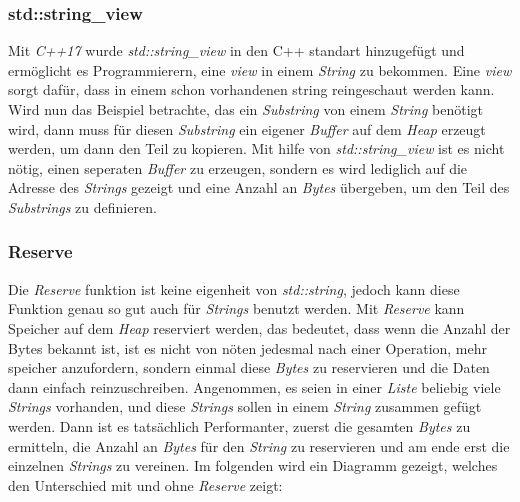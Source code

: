 \subsubsection{std::string\_view}
Mit \emph{C++17} wurde \emph{std::string\_view} in den C++ standart hinzugefügt und ermöglicht es
Programmierern, eine \emph{view} in einem \emph{String} zu bekommen. Eine \emph{view} sorgt
dafür, dass in einem schon vorhandenen string reingeschaut werden kann. Wird nun das Beispiel
betrachte, das ein \emph{Substring} von einem \emph{String} benötigt wird, dann muss für diesen
\emph{Substring} ein eigener \emph{Buffer} auf dem \emph{Heap} erzeugt werden, um dann den Teil
zu kopieren. Mit hilfe von \emph{std::string\_view} ist es nicht nötig, einen seperaten
\emph{Buffer} zu erzeugen, sondern es wird lediglich auf die Adresse des \emph{Strings} gezeigt
und eine Anzahl an \emph{Bytes} übergeben, um den Teil des \emph{Substrings} zu definieren.
\newline
\subsubsection{Reserve}
Die \emph{Reserve} funktion ist keine eigenheit von \emph{std::string}, jedoch kann diese
Funktion genau so gut auch für \emph{Strings} benutzt werden. Mit \emph{Reserve} kann Speicher
auf dem \emph{Heap} reserviert werden, das bedeutet, dass wenn die Anzahl der Bytes bekannt ist,
ist es nicht von nöten jedesmal nach einer Operation, mehr speicher anzufordern, sondern einmal
diese \emph{Bytes} zu reservieren und die Daten dann einfach reinzuschreiben. Angenommen, es
seien in einer \emph{Liste} beliebig viele \emph{Strings} vorhanden, und diese \emph{Strings}
sollen in  einem \emph{String} zusammen gefügt werden. Dann ist es tatsächlich Performanter,
zuerst die gesamten \emph{Bytes} zu ermitteln, die Anzahl an \emph{Bytes} für den \emph{String} zu
reservieren und am ende erst die einzelnen \emph{Strings} zu vereinen. Im folgenden wird ein
Diagramm gezeigt, welches den Unterschied mit und ohne \emph{Reserve} zeigt: